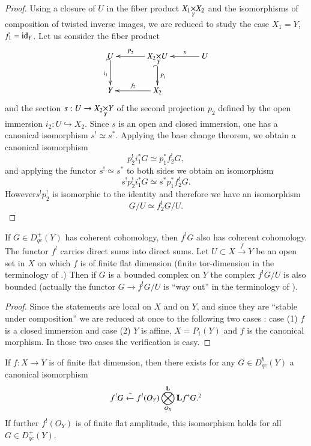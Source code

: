 \begin{proof}
Using a closure of $U$ in the fiber product $\fprod{X_{1}}{X_{2}}{Y}$ and the isomorphisms of composition of twisted inverse images, we are reduced to study the case $X_{1}=Y$, $f_{1}=\operatorname{\mathrm{id}}_{Y}$. Let us consider the fiber product
\[
\xymatrix@C=1.2cm{
U\ar@{_(->}[d]_{i_{1}} & \fprod{X_{2}}{U}{Y}\ar@{_(->}[d]^-{P_{1}}\ar[l]_-{P_{2}} & U\ar[l]_-{s}\\
Y & X_{2}\ar[l]_-{f_{2}} & 
}
\]
and the section $s:U\to \fprod{X_{2}}{Y}{Y}$ of the second projection $p_{2}$ defined by the open immersion $i_{2}:U\hookrightarrow X_{2}$. Since $s$ is an open and closed immersion, one has a canonical isomorphism $s^{!}\simeq s^{*}$. Applying the base change theorem, we obtain a canonical isomorphism
$$
p^{!}_{2}i^{*}_{1}G\simeq p^{*}_{1}f^{!}_{2}G,
$$
and applying the functor $s^{!}\simeq s^{*}$ to both sides we obtain an isomorphism
$$
s^{!}p^{!}_{2}i^{*}_{1}G\simeq s^{*}p^{*}_{1}f^{!}_{2}G.
$$
However\pageoriginale $s^{!}p^{!}_{2}$ is isomorphic to the identity and therefore we have an isomorphism
$$
G/U\simeq f^{!}_{2}G/U.
$$
\end{proof}

\begin{lemma}\label{art20-lem1}
If $G\in D^{+}_{qc}(Y)$ has coherent cohomology, then $f^{!}G$ also has coherent cohomology. The functor $f^{!}$ carries direct sums into direct sums. Let $U\subset X\xrightarrow{f}Y$ be an open set in $X$ on which $f$ is of finite flat dimension (finite tor-dimension in the terminology of \cite{art20-key1}.) Then if $G$ is a bounded complex on $Y$ the complex $f^{!}G/U$ is also bounded (actually the functor $G\to f^{!}G/U$ is ``way out'' in the terminology of \cite{art20-key1}).
\end{lemma}

\begin{proof}
Since the statements are local on $X$ and on $Y$, and since they are ``stable under composition'' we are reduced at once to the following two cases : case (1) $f$ is a closed immersion and case (2) $Y$ is affine, $X=P_{1}(Y)$ and $f$ is the canonical morphism. In those two cases the verification is easy.
\end{proof}

\begin{corollary}\label{art20-coro2}
If $f:X\to Y$ is of finite flat dimension, then there exists for any $G\in D^{b}_{qc}(Y)$ a canonical isomorphism
\setcounter{equation}{0}
\begin{equation}
f^{!}G\xleftarrow{\sim} f^{!}(O_{Y}) \bigotimes\limits^{\bfL}_{O_{X}}\bfL f^{*}G.\footnotemark[2]\label{art20-coro2-eq2.1}
\end{equation}
If further $f^{!}(O_{Y})$ is of finite flat amplitude, this isomorphism holds for all $G\in D^{+}_{qc}(Y)$.
\end{corollary}

